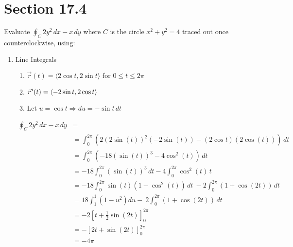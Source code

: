 \documentclass[letter,11pt]{article}
\newcommand{\pvec}[1]{\vec{#1}\mkern2mu\vphantom{#1}}
\begin{document}
\section*{Section 17.4}
Evaluate $\oint_{C} 2y^2\, dx -x \,dy$ where $C$ is the circle $x^2 + y^2 = 4$ traced out once counterclockwise, using:
\begin{enumerate}[label = \roman*.]
    \item Line Integrals
    \begin{enumerate}
        \item $\vec{r}(t)=\langle 2\cos t, 2 \sin t\rangle$ for $0 \leq t\leq 2\pi$
        \item $\pvec{r}'(t)=\langle -2 \sin t,2 \cos t\rangle$
        \item Let $u=\cos t \Longrightarrow du = -\sin t \, dt$
    \end{enumerate}
    
    \begin{align*}
        \oint_{C} 2y^2\, dx -x \,dy &=\\
        &= \int_{0}^{2\pi}\left(2\left(2\sin\left(t\right)\right)^{2}\left(-2\sin\left(t\right)\right)-\left(2\cos t\right)\left(2\cos\left(t\right)\right)\right) \, dt\\
        &= \int_{0}^{2\pi}\left(-18\left(\sin\left(t\right)\right)^{3}-4\cos^{2}\left(t\right)\right)\, dt\\
        &= -18\int_{0}^{2\pi}\left(\sin\left(t\right)\right)^{3}\,dt-4\int_{0}^{2\pi}\cos^{2}\left(t\right)\,t\\
        &= -18\int_{0}^{2\pi}\sin\left(t\right)\left(1-\cos^{2}\left(t\right)\right)\,dt\ - 2\int_{0}^{2\pi}\left(1+\cos\left(2t\right)\right)\,dt\\
        &= 18\int_{1}^{1}\left(1-u^{2}\right)du-\ 2\int_{0}^{2\pi}\left(1+\cos\left(2t\right)\right)\,dt\\
        &= -2\left[t+\frac{1}{2}\sin\left(2t\right)\right]_{0}^{2\pi}\\
        &= -\left[2t+\sin\left(2t\right)\right]_{0}^{2\pi}\\
        &= \boxed{-4\pi}
    \end{align*}
    

\end{enumerate}
\end{document}
